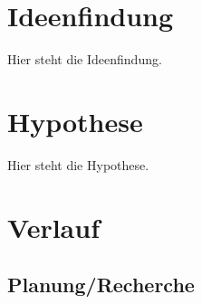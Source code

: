 \documentclass{Bericht}
\begin{document}
\section{Ideenfindung}
	Hier steht die Ideenfindung.

\section{Hypothese}
		Hier steht die Hypothese.

\clearpage
\section{Verlauf}
	\subsection{Planung/Recherche} %
	
\end{document}
